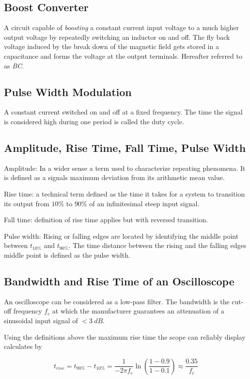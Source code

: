     \subsection*{Boost Converter}
        A circuit capable of \textit{boosting} a constant current input voltage to a much higher output voltage by repeatedly
        switching an inductor on and off. The fly back voltage induced by the break down of the magnetic field gets stored in
        a capacitance and forms the voltage at the output terminals. Hereafter referred to as \textit{BC}.
    \subsection*{Pulse Width Modulation}
        A constant current switched on and off at a fixed frequency. The time the signal is considered high during one period
        is called the duty cycle.
    \subsection*{Amplitude, Rise Time, Fall Time, Pulse Width}
        Amplitude: In a wider sense a term used to characterize repeating phenomena. It is defined as a signals maximum deviation
        from its arithmetic mean value.\par
        Rise time: a technical term defined as the time it takes for a system to transition its output from \( 10\% \) to \( 90\% \)
        of an infinitesimal steep input signal.\par
        Fall time: definition of rise time applies but with reversed transition.\par
        Pulse width: Rising or falling edges are located by identifying the middle point between \( t_{10\%} \) and \( t_{90\%} \).
        The time distance between the rising and the falling edges middle point is defined as the pulse width.
    \subsection*{Bandwidth and Rise Time of an Oscilloscope}
        An oscilloscope can be considered as a low-pass filter. The bandwidth is the cut-off frequency \( f_c \) at which the manufacturer
        guarantees an attenuation of a sinusoidal input signal of \( < \SI{3}{dB} \).\par
        Using the definitions above the maximum rise time the scope can reliably display calculates by\par
        \begin{equation}
            t_{rise} = t_{90\%} - t_{10\%} = \frac{1}{-2\pi f_c} \ln\left( \frac{1-0.9}{1-0.1} \right) \approx \frac{0.35}{f_c}
            \label{eq:bandwidth_and_riseTime}
        \end{equation}
